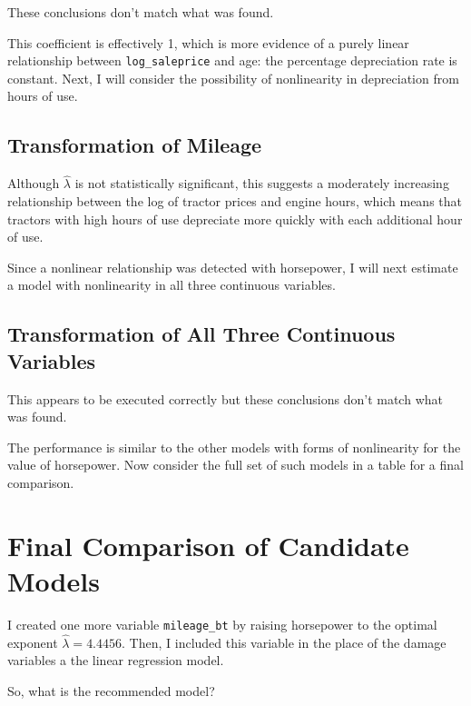 \documentclass[11pt]{paper}
\begin{document}
{\color{red}
These conclusions don't match what was found.
}

This coefficient is effectively 1, which is more evidence of
a purely linear relationship between \texttt{log\_saleprice}
and age: the percentage depreciation rate is constant.
Next, I will consider the possibility of nonlinearity 
in depreciation from hours of use. 

\subsection{Transformation of Mileage}




Although $\hat{\lambda}$ is not statistically significant,
this suggests a moderately increasing relationship
between the log of tractor prices and engine hours,
which means that tractors with high hours of use
depreciate more quickly with each additional hour of use.

Since a nonlinear relationship was detected with horsepower,
I will next estimate a model
with nonlinearity in all three continuous variables.


\subsection{Transformation of All Three Continuous Variables}




{\color{red}
This appears to be executed correctly
but these conclusions don't match what was found.
}


The performance is similar to the other models with
forms of nonlinearity for the value of horsepower.
Now consider the full set of such models in a table for a final comparison.


\pagebreak
\section{Final Comparison of Candidate Models}

I created one more variable \texttt{mileage\_bt}
by raising horsepower to the optimal exponent 
$\hat{\lambda} =4.4456$. 
Then, I included this variable in the place of 
the damage variables a the linear regression model.
% 

% 

{\color{red}
So, what is the recommended model?
}






\end{document}

